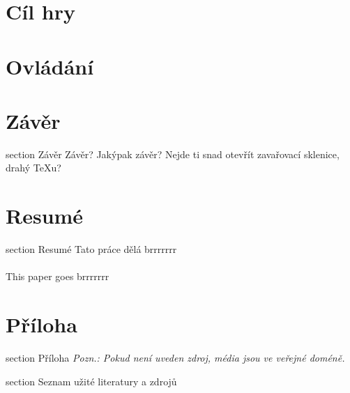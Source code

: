\documentclass[12pt,a4paper,hidelinks]{article}
\begin{document}
\section{Cíl hry}

\clearpage

\section{Ovládání}

\clearpage


\clearpage
\section*{Závěr}
 {section} {Závěr}
Závěr? Jakýpak závěr? Nejde ti snad otevřít zavařovací sklenice, drahý TeXu?

\clearpage

\section*{Resumé}
 {section} {Resumé}
Tato práce dělá brrrrrrr\\
\\
This paper goes brrrrrrr\\


\clearpage

\section*{Příloha}
 {section} {Příloha}
\textit{Pozn.: Pokud není uveden zdroj, média jsou ve veřejné doméně.}
\clearpage


\printbibliography[title={Seznam literatury a zdrojů}]
 {section} {Seznam užité literatury a zdrojů}
\end{document}
